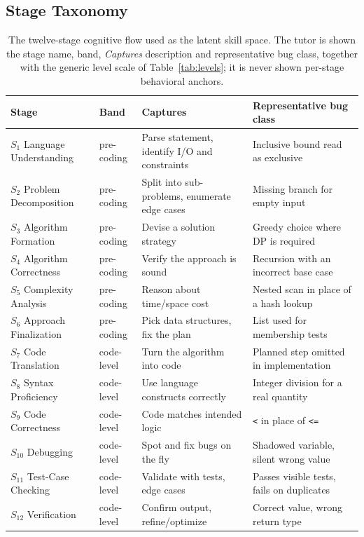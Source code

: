 \subsection{Stage Taxonomy}
\label{app:stages}

\begin{table}[t]
\centering
\small
\begin{tabular}{@{}llp{5.0cm}p{4.6cm}@{}}
\toprule
\textbf{Stage} & \textbf{Band} & \textbf{Captures} & \textbf{Representative bug class} \\
\midrule
$S_1$ Language Understanding  & pre-coding  & Parse statement, identify I/O and constraints & Inclusive bound read as exclusive \\
$S_2$ Problem Decomposition   & pre-coding  & Split into sub-problems, enumerate edge cases & Missing branch for empty input \\
$S_3$ Algorithm Formation     & pre-coding  & Devise a solution strategy & Greedy choice where DP is required \\
$S_4$ Algorithm Correctness   & pre-coding  & Verify the approach is sound & Recursion with an incorrect base case \\
$S_5$ Complexity Analysis     & pre-coding  & Reason about time/space cost & Nested scan in place of a hash lookup \\
$S_6$ Approach Finalization   & pre-coding  & Pick data structures, fix the plan & List used for membership tests \\
$S_7$ Code Translation        & code-level  & Turn the algorithm into code & Planned step omitted in implementation \\
$S_8$ Syntax Proficiency      & code-level  & Use language constructs correctly & Integer division for a real quantity \\
$S_9$ Code Correctness        & code-level  & Code matches intended logic & \texttt{<} in place of \texttt{<=} \\
$S_{10}$ Debugging            & code-level  & Spot and fix bugs on the fly & Shadowed variable, silent wrong value \\
$S_{11}$ Test-Case Checking   & code-level  & Validate with tests, edge cases & Passes visible tests, fails on duplicates \\
$S_{12}$ Verification         & code-level  & Confirm output, refine/optimize & Correct value, wrong return type \\
\bottomrule
\end{tabular}
\caption{The twelve-stage cognitive flow used as the latent skill space. The
tutor is shown the stage name, band, \emph{Captures} description and
representative bug class, together with the generic level scale of
Table~\ref{tab:levels}; it is never shown per-stage behavioral anchors.}
\label{tab:stages}
\end{table}

